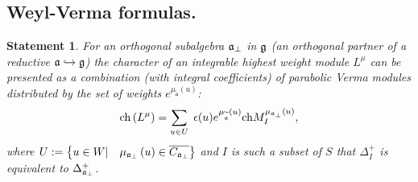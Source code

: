 \documentclass[12pt]{article}
\newtheorem{statement}{Statement}
\theoremstyle{definition}
\begin{document}
\subsection{Weyl-Verma formulas.}

\begin{statement}
\bigskip For an orthogonal subalgebra $\frak{a}_{\perp }$ in $\frak{g}$ (an
orthogonal partner of a reductive $\frak{a}\hookrightarrow \frak{g}$) the
character of an integrable highest weight module $L^{\mu }$ can be presented
as a combination (with integral coefficients) of parabolic Verma modules
distributed by the set of weights $e^{\mu _{\widetilde{\mathfrak{a}}}\left(
u\right) }$:
\begin{equation}
\mathrm{ch}\left( L^{\mu }\right) =\sum_{u\in U}\;\epsilon (u)e^{\mu _{%
\widetilde{\frak{a}}}\left( u\right) }\mathrm{ch}M_{I}^{\mu _{\frak{a}%
_{\perp }}\left( u\right) },  \label{gen Weyl-Verma}
\end{equation}
where $U:=\left\{ u\in W|\quad \mu _{\frak{a}_{\perp }}\left( u\right) \in
\overline{C_{\frak{a}_{\perp }}}\right\} $ and $I$ is such a subset of $S$ that
$\Delta _{I}^{+}$ is
equivalent to $\Delta _{\frak{a}_{\perp }}^{+}$.
\end{statement}
\end{document}
